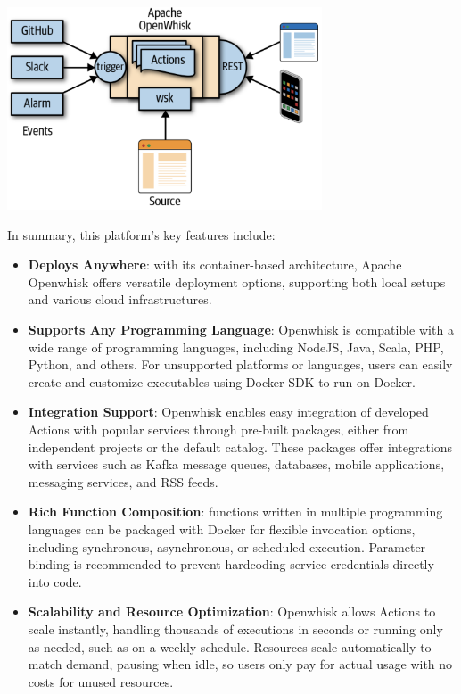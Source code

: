 \begin{center}
    \includegraphics[width=0.7\textwidth]{img/ow_works.png}
    \vspace{10pt}
\end{center}
In summary, this platform’s key features include\cite{huy2021crypto}:
\begin{itemize}
    \item \textbf{Deploys Anywhere}: with its container-based architecture, Apache Openwhisk offers versatile deployment options, supporting both local setups and various cloud infrastructures.
    \item \textbf{Supports Any Programming Language}: Openwhisk is compatible with a wide range of programming languages, including NodeJS, Java, Scala, PHP, Python, and others. For unsupported platforms or languages, users can easily create and customize executables using Docker SDK to run on Docker.
    \item \textbf{Integration Support}: Openwhisk enables easy integration of developed Actions with popular services through pre-built packages, either from independent projects or the default catalog. These packages offer integrations with services such as Kafka message queues, databases, mobile applications, messaging services, and RSS feeds.
    \item \textbf{Rich Function Composition}: functions written in multiple programming languages can be packaged with Docker for flexible invocation options, including synchronous, asynchronous, or scheduled execution. Parameter binding is recommended to prevent hardcoding service credentials directly into code.
    \item \textbf{Scalability and Resource Optimization}: Openwhisk allows Actions to scale instantly, handling thousands of executions in seconds or running only as needed, such as on a weekly schedule. Resources scale automatically to match demand, pausing when idle, so users only pay for actual usage with no costs for unused resources.
\end{itemize}